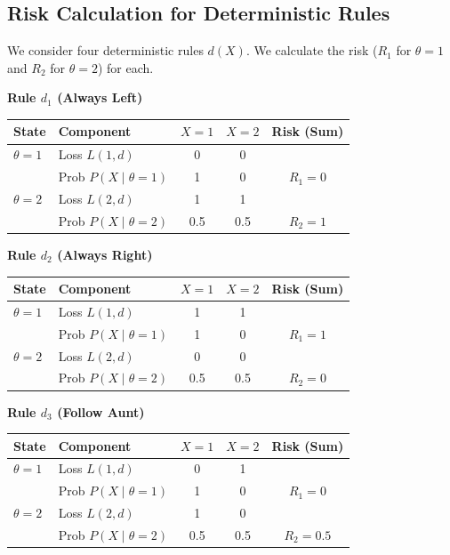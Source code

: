 \documentclass[
  letterpaper,
  DIV=11,
  numbers=noendperiod]{scrreprt}
\renewcommand{\[}{\begin{equation}}
\renewcommand{\]}{\end{equation}}
\theoremstyle{definition}
\theoremstyle{plain}
\theoremstyle{plain}
\theoremstyle{plain}
\theoremstyle{definition}
\theoremstyle{plain}
\theoremstyle{remark}
\begin{document}
\subsection{Risk Calculation for Deterministic
Rules}\label{risk-calculation-for-deterministic-rules}

We consider four deterministic rules \(d(X)\). We calculate the risk
(\(R_1\) for \(\theta=1\) and \(R_2\) for \(\theta=2\)) for each.

\textbf{Rule \(d_1\) (Always Left)}

\begin{longtable}[]{@{}llccc@{}}
\toprule\noalign{}
State & Component & \(X=1\) & \(X=2\) & Risk (Sum) \\
\midrule\noalign{}
\endhead
\bottomrule\noalign{}
\endlastfoot
\textbf{\(\theta=1\)} & Loss \(L(1, d)\) & 0 & 0 & \\
& Prob \(P(X \mid \theta=1)\) & 1 & 0 & \textbf{\(R_1 = 0\)} \\
\textbf{\(\theta=2\)} & Loss \(L(2, d)\) & 1 & 1 & \\
& Prob \(P(X \mid \theta=2)\) & 0.5 & 0.5 & \textbf{\(R_2 = 1\)} \\
\end{longtable}

\textbf{Rule \(d_2\) (Always Right)}

\begin{longtable}[]{@{}llccc@{}}
\toprule\noalign{}
State & Component & \(X=1\) & \(X=2\) & Risk (Sum) \\
\midrule\noalign{}
\endhead
\bottomrule\noalign{}
\endlastfoot
\textbf{\(\theta=1\)} & Loss \(L(1, d)\) & 1 & 1 & \\
& Prob \(P(X \mid \theta=1)\) & 1 & 0 & \textbf{\(R_1 = 1\)} \\
\textbf{\(\theta=2\)} & Loss \(L(2, d)\) & 0 & 0 & \\
& Prob \(P(X \mid \theta=2)\) & 0.5 & 0.5 & \textbf{\(R_2 = 0\)} \\
\end{longtable}

\textbf{Rule \(d_3\) (Follow Aunt)}

\begin{longtable}[]{@{}llccc@{}}
\toprule\noalign{}
State & Component & \(X=1\) & \(X=2\) & Risk (Sum) \\
\midrule\noalign{}
\endhead
\bottomrule\noalign{}
\endlastfoot
\textbf{\(\theta=1\)} & Loss \(L(1, d)\) & 0 & 1 & \\
& Prob \(P(X \mid \theta=1)\) & 1 & 0 & \textbf{\(R_1 = 0\)} \\
\textbf{\(\theta=2\)} & Loss \(L(2, d)\) & 1 & 0 & \\
& Prob \(P(X \mid \theta=2)\) & 0.5 & 0.5 & \textbf{\(R_2 = 0.5\)} \\
\end{longtable}
\end{document}
